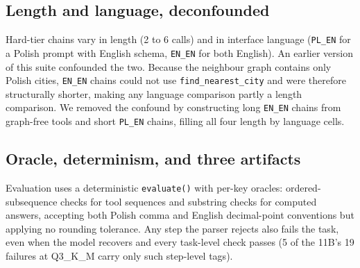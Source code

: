 \documentclass[11pt]{article}
\begin{document}
\subsection{Length and language, deconfounded}
\label{sec:axes}
\begin{sloppypar}\noindent Hard-tier chains vary in length (2 to 6 calls) and in interface language (\texttt{PL\_EN} for a Polish prompt with English schema, \texttt{EN\_EN} for both English). An earlier version of this suite confounded the two. Because the neighbour graph contains only Polish cities, \texttt{EN\_EN} chains could not use \texttt{find\_nearest\_city} and were therefore structurally shorter, making any language comparison partly a length comparison. We removed the confound by constructing long \texttt{EN\_EN} chains from graph-free tools and short \texttt{PL\_EN} chains, filling all four length by language cells.\end{sloppypar}

\subsection{Oracle, determinism, and three artifacts}
\label{sec:mines}
Evaluation uses a deterministic \texttt{evaluate()} with per-key oracles: ordered-subsequence checks for tool sequences and substring checks for computed answers, accepting both Polish comma and English decimal-point conventions but applying no rounding tolerance. Any step the parser rejects also fails the task, even when the model recovers and every task-level check passes (5 of the 11B's 19 failures at Q3\_K\_M carry only such step-level tags).
\end{document}
